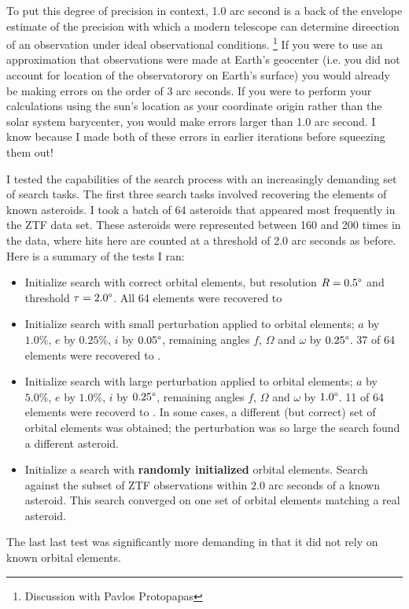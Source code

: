To put this degree of precision in context, 1.0 arc second is a back of the envelope estimate of the 
precision with which a modern telescope can determine direection of an observation under ideal observational conditions.
\footnote{Discussion with Pavlos Protopapas}
If you were to use an approximation that observations were made at Earth's geocenter 
(i.e. you did not account for location of the observatorory on Earth's surface) 
you would already be making errors on the order of 3 arc seconds.
If you were to perform your calculations using the sun's location as your coordinate origin rather than the solar system barycenter,
you would make errors larger than 1.0 arc second.
I know because I made both of these errors in earlier iterations before squeezing them out!

I tested the capabilities of the search process with an increasingly demanding set of search tasks.
The first three search tasks involved recovering the elements of known asteroids.
I took a batch of 64 asteroids that appeared most frequently in the ZTF data set.
These asteroids were represented between 160 and 200 times in the data, 
where hits here are counted at a threshold of 2.0 arc seconds as before.
Here is a summary of the tests I ran:
\begin{itemize}
\item Initialize search with correct orbital elements, but resolution $R = 0.5 \degree$ and threshold $\tau = 2.0 \degree$.
All 64 elements were recovered to 
\item Initialize search with small perturbation applied to orbital elements; $a$ by $1.0\%$, $e$ by $0.25\%$, $i$ by $0.05 \degree$,
remaining angles $f$, $\Omega$ and $\omega$ by $0.25 \degree$.
37 of 64 elements were recovered to .
\item Initialize search with large perturbation applied to orbital elements; $a$ by $5.0\%$, $e$ by $1.0\%$, $i$ by $0.25 \degree$,
remaining angles $f$, $\Omega$ and $\omega$ by $1.0 \degree$.
11 of 64 elements were recoverd to .
In some cases, a different (but correct) set of orbital elements was obtained;
the perturbation was so large the search found a different asteroid.
\item Initialize a search with \textbf{randomly initialized} orbital elements.
Search against the subset of ZTF observations within $2.0$ arc seconds of a known asteroid.
This search converged on one set of orbital elements matching a real asteroid.
\end{itemize}
The last last test was significantly more demanding in that it did not rely on known orbital elements.

